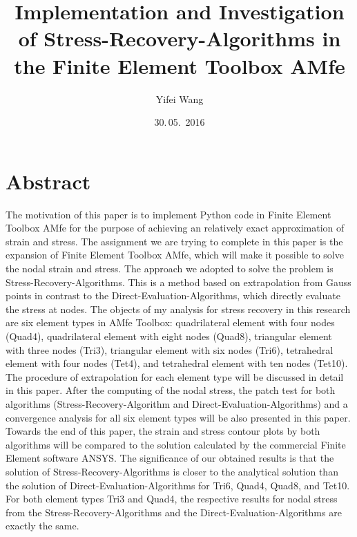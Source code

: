 \documentclass[nenglish]{AMSemesterArbeit}
\author{Yifei Wang}
\title{%
	Implementation and Investigation of Stress-Recovery-Algorithms in the Finite Element Toolbox AMfe
	}
\date{30.\,05.~2016}
\begin{document}
\renewcommand{\arraystretch}{2.5}
\frontmatter
\maketitle
\section*{Abstract}
The motivation of this paper is to implement Python code in Finite Element Toolbox AMfe for the purpose of achieving an relatively exact approximation of strain and stress. The assignment we are trying to complete in this paper is the expansion of Finite Element Toolbox AMfe, which will make it possible to solve the nodal strain and stress. The approach we adopted to solve the problem is Stress-Recovery-Algorithms. This is a method based on extrapolation from Gauss points in contrast to the Direct-Evaluation-Algorithms, which directly evaluate the stress at nodes. The objects of my analysis for stress recovery in this research are six element types in AMfe Toolbox: quadrilateral element with four nodes (Quad4), quadrilateral element with eight nodes (Quad8), triangular element with three nodes (Tri3), triangular element with six nodes (Tri6), tetrahedral element with four nodes (Tet4), and tetrahedral element with ten nodes (Tet10). The procedure of extrapolation for each element type will be discussed in detail in this paper. After the computing of the nodal stress, the patch test for both algorithms (Stress-Recovery-Algorithm and Direct-Evaluation-Algorithms) and a convergence analysis for all six element types will be also presented in this paper. Towards the end of this paper, the strain and stress contour plots by both algorithms will be compared to the solution calculated by the commercial Finite Element software ANSYS. The significance of our obtained results is that the solution of Stress-Recovery-Algorithms is closer to the analytical solution than the solution of Direct-Evaluation-Algorithms for Tri6, Quad4, Quad8, and Tet10. For both element types Tri3 and Quad4, the respective results for nodal stress from the Stress-Recovery-Algorithms and the Direct-Evaluation-Algorithms are exactly the same.



\PrintTablesAndListsOfContents
\mainmatter

\backmatter
\AMPrintBibliography
\end{document}
